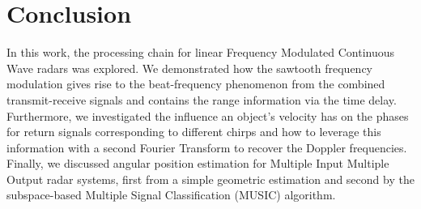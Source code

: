 \chapter{Conclusion}
In this work, the processing chain for linear Frequency Modulated Continuous
Wave radars was explored. We demonstrated how the sawtooth frequency modulation
gives rise to the beat-frequency phenomenon from the combined transmit-receive
signals and contains the range information via the time delay. Furthermore, we
investigated the influence an object's velocity has on the phases for return
signals corresponding to different chirps and how to leverage this information
with a second Fourier Transform to recover the Doppler frequencies. Finally, we
discussed angular position estimation for Multiple Input Multiple Output radar
systems, first from a simple geometric estimation and second by the
subspace-based Multiple Signal Classification (MUSIC) algorithm. 
